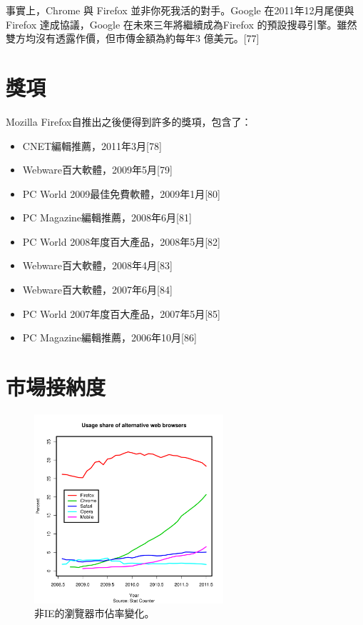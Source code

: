 \documentclass[12pt]{article}
\begin{document}
事實上，Chrome 與 Firefox 並非你死我活的對手。Google 在2011年12月尾便與Firefox 達成協議，Google 在未來三年將繼續成為Firefox 的預設搜尋引擎。雖然雙方均沒有透露作價，但市傳金額為約每年3 億美元。[77]

\section{獎項}

Mozilla Firefox自推出之後便得到許多的獎項，包含了：

\begin{itemize}
\item CNET編輯推薦，2011年3月[78]
\item Webware百大軟體，2009年5月[79]
\item PC World 2009最佳免費軟體，2009年1月[80]
\item PC Magazine編輯推薦，2008年6月[81]
\item PC World 2008年度百大產品，2008年5月[82]
\item Webware百大軟體，2008年4月[83]
\item Webware百大軟體，2007年6月[84]
\item PC World 2007年度百大產品，2007年5月[85]
\item PC Magazine編輯推薦，2006年10月[86]
\end{itemize}

\section{市場接納度}

\begin{figure}
  \begin{center}
    \includegraphics[width=70mm]{Usage}
  \end{center}
  \caption{非IE的瀏覽器市佔率變化。}
\end{figure}
\end{document}
